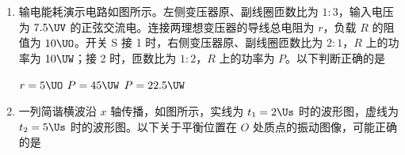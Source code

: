\documentclass[\gkver]{gaokaozhenti}
\begin{document}
\begin{enumerate}
{	根据右手定则可知，导体绳产生的感应电动势相当于上端为正极的电源，其大小为 $E' = BLv$

	因导线绳所受阻力 $f$ 与安培力 $F$ 平衡，则安培力与速度方向相同，可知导线绳中的电流方向向下，即电池电动势大于导线绳切割磁感线产生的电动势，可得 $f = B\frac{E - E'}{r}L$

	解得 $E = BL\sqrt{\frac{GM}{R+H}} + \frac{fr}{BL}$

	故选 A。
}

\item
输电能耗演示电路如图所示。左侧变压器原、副线圈匝数比为 $1:3$，输入电压为 $7.5 \UV$ 的正弦交流电。连接两理想变压器的导线总电阻为 $r$，负载 $R$ 的阻值为 $10 \UO$。开关 S 接 1 时，右侧变压器原、副线圈匝数比为 $2:1$，$R$ 上的功率为 $10 \UW$；接 2 时，匝数比为 $1:2$，$R$ 上的功率为 $P$。以下判断正确的是 


{$r = 5 \UO$}
{$P = 45 \UW$}
{$P = 22.5 \UW$}


\item
一列简谐横波沿 $x$ 轴传播，如图所示，实线为 $t_{1} = 2 \Us$ 时的波形图，虚线为 $t_{2} = 5 \Us$ 时的波形图。以下关于平衡位置在 $O$ 处质点的振动图像，可能正确的是 


\end{enumerate}
\end{document}
